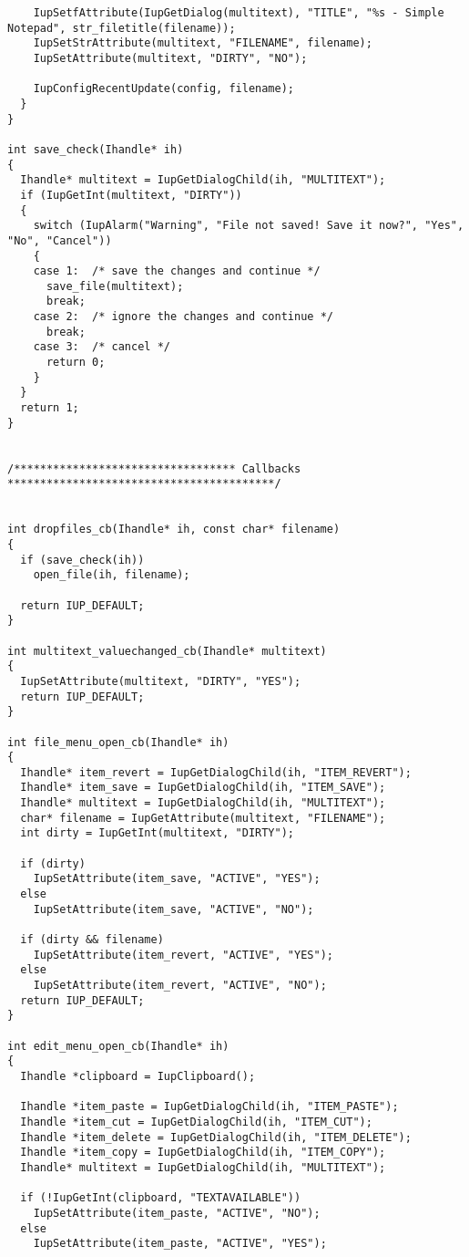 \documentclass{ctexart}
\begin{document}
\begin{lstlisting}
    IupSetfAttribute(IupGetDialog(multitext), "TITLE", "%s - Simple Notepad", str_filetitle(filename));
    IupSetStrAttribute(multitext, "FILENAME", filename);
    IupSetAttribute(multitext, "DIRTY", "NO");

    IupConfigRecentUpdate(config, filename);
  }
}

int save_check(Ihandle* ih)
{
  Ihandle* multitext = IupGetDialogChild(ih, "MULTITEXT");
  if (IupGetInt(multitext, "DIRTY"))
  {
    switch (IupAlarm("Warning", "File not saved! Save it now?", "Yes", "No", "Cancel"))
    {
    case 1:  /* save the changes and continue */
      save_file(multitext);
      break;
    case 2:  /* ignore the changes and continue */
      break;
    case 3:  /* cancel */
      return 0;  
    }
  }
  return 1;
}


/********************************** Callbacks *****************************************/


int dropfiles_cb(Ihandle* ih, const char* filename)
{
  if (save_check(ih))
    open_file(ih, filename);

  return IUP_DEFAULT;
}

int multitext_valuechanged_cb(Ihandle* multitext)
{
  IupSetAttribute(multitext, "DIRTY", "YES");
  return IUP_DEFAULT;
}

int file_menu_open_cb(Ihandle* ih)
{
  Ihandle* item_revert = IupGetDialogChild(ih, "ITEM_REVERT");
  Ihandle* item_save = IupGetDialogChild(ih, "ITEM_SAVE");
  Ihandle* multitext = IupGetDialogChild(ih, "MULTITEXT");
  char* filename = IupGetAttribute(multitext, "FILENAME");
  int dirty = IupGetInt(multitext, "DIRTY");

  if (dirty)
    IupSetAttribute(item_save, "ACTIVE", "YES");
  else
    IupSetAttribute(item_save, "ACTIVE", "NO");

  if (dirty && filename)
    IupSetAttribute(item_revert, "ACTIVE", "YES");
  else
    IupSetAttribute(item_revert, "ACTIVE", "NO");
  return IUP_DEFAULT;
}

int edit_menu_open_cb(Ihandle* ih)
{
  Ihandle *clipboard = IupClipboard(); 

  Ihandle *item_paste = IupGetDialogChild(ih, "ITEM_PASTE");
  Ihandle *item_cut = IupGetDialogChild(ih, "ITEM_CUT");
  Ihandle *item_delete = IupGetDialogChild(ih, "ITEM_DELETE");
  Ihandle *item_copy = IupGetDialogChild(ih, "ITEM_COPY");
  Ihandle* multitext = IupGetDialogChild(ih, "MULTITEXT");

  if (!IupGetInt(clipboard, "TEXTAVAILABLE"))
    IupSetAttribute(item_paste, "ACTIVE", "NO");
  else
    IupSetAttribute(item_paste, "ACTIVE", "YES");


\end{lstlisting}
\end{document}
